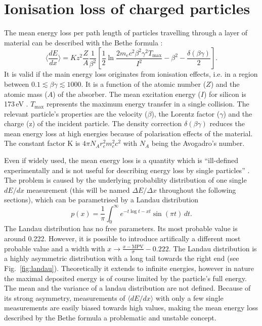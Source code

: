 \section{Ionisation loss of charged particles}
\label{sec:sub:MeasuringDeDx}
The mean energy loss per path length of particles travelling through a layer of material can be described with the Bethe formula \cite{bib:Bethe_1930}:
\begin{equation*}
\langle \frac{dE}{dx} \rangle = Kz^2\frac{Z}{A}\frac{1}{\beta^2} [ \frac{1}{2} \ln{\frac{2m_e c^2 \beta^2 \gamma^2 T_{\text{max}}}{I^2}} - \beta^2 - \frac{\delta( \beta \gamma )}{2} ].
\end{equation*}
It is valid if the main energy loss originates from ionisation effects, i.e. in a region between $0.1\lesssim\beta\gamma\lesssim 1000$.
It is a function of the atomic number ($Z$) and the atomic mass ($A$) of the absorber. 
The mean excitation energy ($I$) for silicon is 173\,eV \cite{bib:NIST}. 
$T_{\text{max}}$ represents the maximum energy transfer in a single collision.
The relevant particle's properties are the velocity ($\beta$), the Lorentz factor ($\gamma$) and the charge (z) of the incident particle.
The density correction $\delta( \beta \gamma )$ reduces the mean energy loss at high energies because of polarisation effects of the material. 
The constant factor K is $4\pi N_A r_e^2 m_e^2 c^2$ with $N_A$ being the Avogadro’s number.

Even if widely used, the mean energy loss is a quantity which is ``ill-defined experimentally and is not useful for describing energy loss by single particles'' \cite{bib:PDG_2014}.
The problem is caused by the underlying probability distribution of one single $dE/dx$ measurement (this will be named $\Delta E/ \Delta x $ throughout the following sections), which can be parametrised by a Landau distribution \cite{bib:Landau_1944}
\begin{equation*}
p(x) = \frac{1}{\pi} \int_0^\infty\! e^{-t \log t - x t} \sin(\pi t)\, dt.
\end{equation*}
The Landau distribution has no free parameters. Its most probable value is around 0.222.
However, it is possible to introduce artifically a different most probable value and a width with $x \rightarrow \frac{x-\text{MPV}}{\sigma}-0.222$.
The Landau distribution is a highly asymmetric distribution with a long tail towards the right end (see Fig.~\ref{fig:landau}).
Theoretically it extends to infinite energies, however in nature the maximal deposited energy is of course limited by the particle's full energy.
The mean and the variance of a landau distribution are not defined.
Because of its strong asymmetry, measurements of $\langle dE/dx \rangle$ with only a few single measurements are easily biased towards high values, making the mean energy loss described by the Bethe formula a problematic and unstable concept. 


